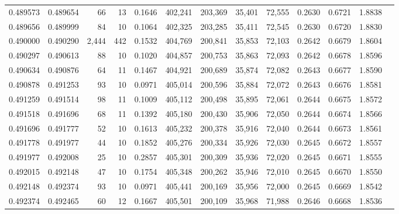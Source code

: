 \begin{tabular}{rrrrrrrrrrrrr}
0.489573 & 0.489654 &    66 &  13 &                                     0.1646 & 402,241 & 203,369 &  35,401 &  72,555 & 0.2630 & 0.6721 & 1.8838 \\
0.489656 & 0.489999 &    84 &  10 &                                     0.1064 & 402,325 & 203,285 &  35,411 &  72,545 & 0.2630 & 0.6720 & 1.8830 \\
0.490000 & 0.490290 & 2,444 & 442 &                                     0.1532 & 404,769 & 200,841 &  35,853 &  72,103 & 0.2642 & 0.6679 & 1.8604 \\
0.490297 & 0.490613 &    88 &  10 &                                     0.1020 & 404,857 & 200,753 &  35,863 &  72,093 & 0.2642 & 0.6678 & 1.8596 \\
0.490634 & 0.490876 &    64 &  11 &                                     0.1467 & 404,921 & 200,689 &  35,874 &  72,082 & 0.2643 & 0.6677 & 1.8590 \\
0.490878 & 0.491253 &    93 &  10 &                                     0.0971 & 405,014 & 200,596 &  35,884 &  72,072 & 0.2643 & 0.6676 & 1.8581 \\
0.491259 & 0.491514 &    98 &  11 &                                     0.1009 & 405,112 & 200,498 &  35,895 &  72,061 & 0.2644 & 0.6675 & 1.8572 \\
0.491518 & 0.491696 &    68 &  11 &                                     0.1392 & 405,180 & 200,430 &  35,906 &  72,050 & 0.2644 & 0.6674 & 1.8566 \\
0.491696 & 0.491777 &    52 &  10 &                                     0.1613 & 405,232 & 200,378 &  35,916 &  72,040 & 0.2644 & 0.6673 & 1.8561 \\
0.491778 & 0.491977 &    44 &  10 &                                     0.1852 & 405,276 & 200,334 &  35,926 &  72,030 & 0.2645 & 0.6672 & 1.8557 \\
0.491977 & 0.492008 &    25 &  10 &                                     0.2857 & 405,301 & 200,309 &  35,936 &  72,020 & 0.2645 & 0.6671 & 1.8555 \\
0.492015 & 0.492148 &    47 &  10 &                                     0.1754 & 405,348 & 200,262 &  35,946 &  72,010 & 0.2645 & 0.6670 & 1.8550 \\
0.492148 & 0.492374 &    93 &  10 &                                     0.0971 & 405,441 & 200,169 &  35,956 &  72,000 & 0.2645 & 0.6669 & 1.8542 \\
0.492374 & 0.492465 &    60 &  12 &                                     0.1667 & 405,501 & 200,109 &  35,968 &  71,988 & 0.2646 & 0.6668 & 1.8536 \\

\end{tabular}
